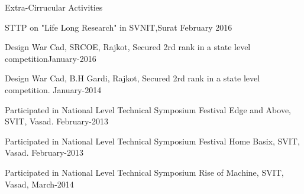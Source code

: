 \documentclass{resume} %
\begin{document}
\begin{rSection}{Extra-Cirrucular Activities} \itemsep -1pt {}   
\item STTP on "Life Long Research" in SVNIT,Surat \hfill February 2016
\item Design War Cad, SRCOE, Rajkot, Secured 2rd rank in a state level competition\hfill January-2016
\item  Design War Cad, B.H Gardi, Rajkot, Secured 2rd rank in a
state level competition. \hfill January-2014 
\item Participated in National Level Technical Symposium Festival Edge and Above, SVIT, Vasad. \hfill February-2013
\item Participated in National Level Technical Symposium Festival Home Basix, SVIT, Vasad.
 \hfill  February-2013 
\item Participated in National Level Technical Symposium Rise of Machine, SVIT, Vasad,  \hfill March-2014 
 

\end{rSection}
\fi
\end{document}
